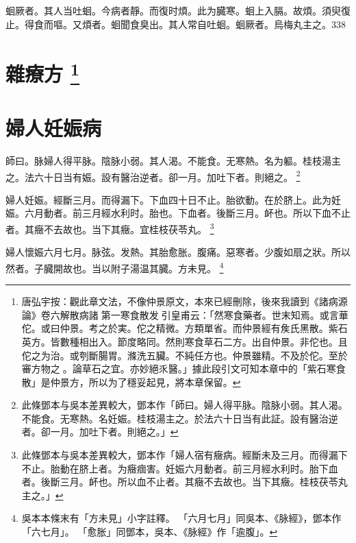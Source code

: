 蛔厥者。其人当吐蛔。今病者靜。而復时煩。此为臓寒。蛔上入膈。故煩。須臾復止。得食而嘔。又煩者。蛔聞食臭出。其人常自吐蛔。蛔厥者。烏梅丸主之。338

\chapter{雜療方
	\footnote{
		唐弘宇按：觀此章文法，不像仲景原文，本來已經刪除，後來我讀到《諸病源{\sungii 𠊱}論》卷六解散病諸{\sungii 𠊱}第一寒食散发{\sungii 𠊱}引皇甫云：「然寒食藥者。世末知焉。或言華佗。或曰仲景。考之於実。佗之精微。方類單省。而仲景經有矦氏黑散。紫石英方。皆數種相出入。節度略同。然則寒食草石二方。出自仲景。非佗也。且佗之为治。或刳斷腸胃。滌洗五臟。不純任方也。仲景雖精。不及於佗。至於審方物之{\sungii 𠊱}。論草石之宜。亦妙絕乑醫。」據此段引文可知本章中的「紫石寒食散」是仲景方，所以为了穩妥起見，將本章保留。
	}
}







\chapter{婦人妊娠病}

師曰。脉婦人得平脉。陰脉小弱。其人渴。不能食。无寒熱。名为軀。桂枝湯主之。法六十日当有娠。設有醫治逆者。卻一月。加吐下者。則絕之。
	\footnote{
		此條鄧本与吳本差異較大，鄧本作「師曰。婦人得平脉。陰脉小弱。其人渴。不能食。无寒熱。名妊娠。桂枝湯主之。於法六十日当有此証。設有醫治逆者。卻一月。加吐下者。則絕之。」
	}

婦人妊娠。經斷三月。而得漏下。下血四十日不止。胎欲動。在於脐上。此为妊娠。六月動者。前三月經水利时。胎也。下血者。後斷三月。衃也。所以下血不止者。其癥不去故也。当下其癥。宜桂枝茯苓丸。
	\footnote{
		此條鄧本与吳本差異較大，鄧本作「婦人宿有癥病。經斷未及三月。而得漏下不止。胎動在脐上者。为癥痼害。妊娠六月動者。前三月經水利时。胎下血者。後斷三月。衃也。所以血不止者。其癥不去故也。当下其癥。桂枝茯苓丸主之。」
	}

婦人懷娠六月七月。脉弦。发熱。其胎愈胀。腹痛。惡寒者。少腹如扇之狀。所以然者。子臓開故也。当以附子湯温其臓。{\scriptsize 方未見。}
	\footnote{
		吳本本條末有「方未見」小字註釋。
		「六月七月」同吳本、《脉經》，鄧本作「六七月」。
		「愈胀」同鄧本，吳本、《脉經》作「逾腹」。
	}

